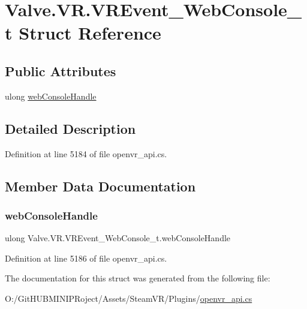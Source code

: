 \hypertarget{struct_valve_1_1_v_r_1_1_v_r_event___web_console__t}{}\section{Valve.\+V\+R.\+V\+R\+Event\+\_\+\+Web\+Console\+\_\+t Struct Reference}
\label{struct_valve_1_1_v_r_1_1_v_r_event___web_console__t}
\subsection*{Public Attributes}
\begin{DoxyCompactItemize}
\item 
ulong \mbox{\hyperlink{struct_valve_1_1_v_r_1_1_v_r_event___web_console__t_ae6e2bacbe4f57252e60d49df8bd2e1c0}{web\+Console\+Handle}}
\end{DoxyCompactItemize}


\subsection{Detailed Description}


Definition at line 5184 of file openvr\+\_\+api.\+cs.



\subsection{Member Data Documentation}
\mbox{\label{struct_valve_1_1_v_r_1_1_v_r_event___web_console__t_ae6e2bacbe4f57252e60d49df8bd2e1c0}} 
\subsubsection{\texorpdfstring{webConsoleHandle}{webConsoleHandle}}
{\footnotesize\ttfamily ulong Valve.\+V\+R.\+V\+R\+Event\+\_\+\+Web\+Console\+\_\+t.\+web\+Console\+Handle}



Definition at line 5186 of file openvr\+\_\+api.\+cs.



The documentation for this struct was generated from the following file\+:\begin{DoxyCompactItemize}
\item 
O\+:/\+Git\+H\+U\+B\+M\+I\+N\+I\+P\+Roject/\+Assets/\+Steam\+V\+R/\+Plugins/\mbox{\hyperlink{openvr__api_8cs}{openvr\+\_\+api.\+cs}}\end{DoxyCompactItemize}
